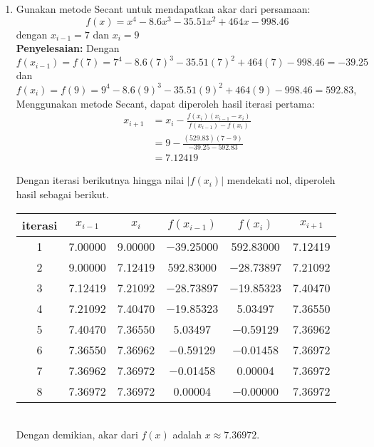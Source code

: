 \documentclass{article}
\newcommand{\penyelesaian}{\textbf{Penyelesaian: }}
\begin{document}
\begin{enumerate}
    \item Gunakan metode Secant untuk mendapatkan akar dari persamaan:
    \begin{equation*}
        f(x) = x^4 - \num{8,6}x^3 - \num{35,51}x^2 + \num{464}x - \num{998,46}
    \end{equation*}
    dengan $x_{i-1} = \num{7}$ dan $x_i = \num{9}$ \\
    \penyelesaian Dengan \\
    $f(x_{i-1}) = f(7) = 7^4 - \num{8,6}(7)^3 - \num{35,51}(7)^2 + \num{464}(7) - \num{998,46} = \num{-39,25}$ dan \\
    $f(x_i) = f(9) = 9^4 - \num{8,6}(9)^3 - \num{35,51}(9)^2 + \num{464}(9) - \num{998,46} = \num{592,83}$, \\
    Menggunakan metode Secant, dapat diperoleh hasil iterasi pertama:
    \begin{align*}
        x_{i+1} &= x_i - \frac{f(x_i)(x_{i-1} - x_i)}{f(x_{i-1}) - f(x_i)} \\
        &= 9 - \frac{(\num{529,83})(7 - 9)}{\num{-39,25} - \num{592,83}} \\
        &= \num{7,12419}
    \end{align*}

    Dengan iterasi berikutnya hingga nilai $|f(x_i)|$ mendekati nol, diperoleh hasil sebagai berikut.\\
    \begin{tabular}{|c|c|c|c|c|c|}
        \hline
        iterasi & $x_{i-1}$ & $x_i$ & $f(x_{i-1})$ & $f(x_i)$ & $x_{i+1}$ \\
        \hline
        1 & \num{7,00000} & \num{9,00000} & \num{-39,25000} & \num{592,83000} & \num{7,12419}\\
        2 & \num{9,00000} & \num{7,12419} & \num{592,83000} & \num{-28,73897} & \num{7,21092}\\
        3 & \num{7,12419} & \num{7,21092} & \num{-28,73897} & \num{-19,85323} & \num{7,40470}\\
        4 & \num{7,21092} & \num{7,40470} & \num{-19,85323} & \num{5,03497} & \num{7,36550}\\
        5 & \num{7,40470} & \num{7,36550} & \num{5,03497} & \num{-0,59129} & \num{7,36962}\\
        6 & \num{7,36550} & \num{7,36962} & \num{-0,59129} & \num{-0,01458} & \num{7,36972}\\
        7 & \num{7,36962} & \num{7,36972} & \num{-0,01458} & \num{0,00004} & \num{7,36972}\\
        8 & \num{7,36972} & \num{7,36972} & \num{0,00004} & \num{-0,00000} & \num{7,36972}\\
         \hline
        \end{tabular} \\
    Dengan demikian, akar dari $f(x)$ adalah $x \approx \num{7,36972}$.


\end{enumerate}
\end{document}
